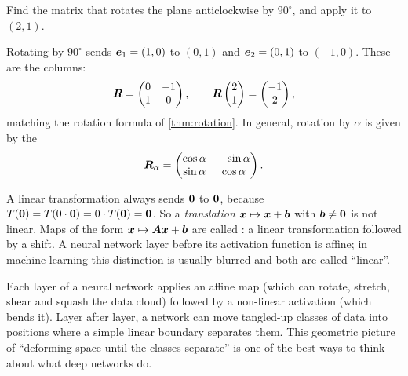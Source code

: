 \begin{example}
Find the matrix that rotates the plane anticlockwise by $90^\circ$, and apply
it to $(2, 1)$.

\sol Rotating by $90^\circ$ sends $\bm{e}_1 = (1, 0)$ to $(0, 1)$ and
$\bm{e}_2 = (0, 1)$ to $(-1, 0)$. These are the columns:
\[
  \bm{R} = \begin{pmatrix} 0 & -1\\ 1 & 0\end{pmatrix},
  \qquad
  \bm{R}\begin{pmatrix} 2\\ 1\end{pmatrix} = \begin{pmatrix} -1\\ 2\end{pmatrix},
\]
matching the rotation formula of \cref{thm:rotation}. In general, rotation by
$\alpha$ is given by the 
\[
  \bm{R}_\alpha = \begin{pmatrix} \cos\alpha & -\sin\alpha\\
  \sin\alpha & \cos\alpha\end{pmatrix}.
\]
\end{example}

\begin{remark}
A linear transformation always sends $\bm{0}$ to $\bm{0}$, because
$T(\bm{0}) = T(0\cdot\bm{0}) = 0\cdot T(\bm{0}) = \bm{0}$. So a
\emph{translation} $\bm{x} \mapsto \bm{x} + \bm{b}$ with $\bm{b} \neq \bm{0}$ is not linear.
Maps of the form $\bm{x} \mapsto \bm{A}\bm{x} + \bm{b}$ are called : a linear transformation followed by a shift. A neural network
layer before its activation function is affine; in machine learning this
distinction is usually blurred and both are called ``linear''.
\end{remark}

\begin{mlnote}
Each layer of a neural network applies an affine map (which can rotate,
stretch, shear and squash the data cloud) followed by a non-linear activation
(which bends it). Layer after layer, a network can move tangled-up classes of
data into positions where a simple linear boundary separates them. This
geometric picture of ``deforming space until the classes separate'' is one of
the best ways to think about what deep networks do.
\end{mlnote}

\sectionexercises

